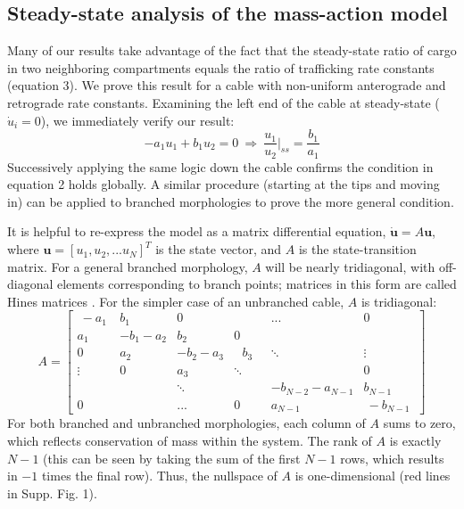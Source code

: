 \documentclass[11pt]{wlpeerj}
\begin{document}
\subsection*{Steady-state analysis of the mass-action model}

Many of our results take advantage of the fact that the steady-state ratio of cargo in two neighboring compartments equals the ratio of trafficking rate constants (equation 3). We prove this result for a cable with non-uniform anterograde and retrograde rate constants. Examining the left end of the cable at steady-state ($\dot{u}_i = 0$), we immediately verify our result:
$$
-a_{1} u_{1} + b_{1} u_2 = 0 ~\Rightarrow~ \frac{u_1}{u_2} \Bigg |_{ss} = \frac{b_1}{a_1}
$$
Successively applying the same logic down the cable confirms the condition in equation 2 holds globally. A similar procedure (starting at the tips and moving in) can be applied to branched morphologies to prove the more general condition.


It is helpful to re-express the model as a matrix differential equation, $\mathbf{\dot{u}} = A \mathbf{u}$, where $\mathbf{u} = \left[ u_1, u_2, ... u_N \right]^T$ is the state vector, and $A$ is the state-transition matrix. For a general branched morphology, $A$ will be nearly tridiagonal, with off-diagonal elements corresponding to branch points; matrices in this form are called Hines matrices \citep{Hines_1984}. For the simpler case of an unbranched cable, $A$ is tridiagonal:
$$
A = 
 \begin{bmatrix}
  ~-a_1~  & b_1      & 0         &         & ...              & 0        \\
   a_1    & -b_1-a_2 & b_2       &  0      &                  &          \\
   0      &  a_2     & -b_2-a_3  & ~~~ b_3~~~  & \ddots     & \vdots   \\
   \vdots &  0       & a_3       & \ddots  &                  & 0        \\
          &          & \ddots    &         & -b_{N-2}-a_{N-1} & b_{N-1}  \\
   0      &          & ...       &  0      & a_{N-1}          & ~-b_{N-1}~
 \end{bmatrix}
$$
For both branched and unbranched morphologies, each column of $A$ sums to zero, which reflects conservation of mass within the system. The rank of $A$ is exactly $N-1$ (this can be seen by taking the sum of the first $N-1$ rows, which results in $-1$ times the final row). Thus, the nullspace of $A$ is one-dimensional (red lines in Supp. Fig. 1).
\end{document}

